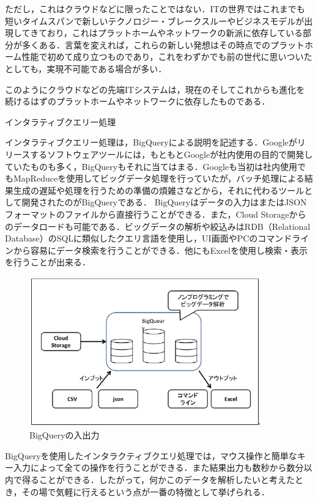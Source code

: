 ただし，これはクラウドなどに限ったことではない．ITの世界ではこれまでも短いタイムスパンで新しいテクノロジー・ブレークスルーやビジネスモデルが出現してきており，これはプラットホームやネットワークの新派に依存している部分が多くある．言葉を変えれば，これらの新しい発想はその時点でのプラットホーム性能で初めて成り立つものであり，これをわずかでも前の世代に思いついたとしても，実現不可能である場合が多い．

このようにクラウドなどの先端ITシステムは，現在のそしてこれからも進化を続けるはずのプラットホームやネットワークに依存したものである．


インタラティブクエリー処理

インタラティブクエリー処理は，BigQueryによる説明を記述する．Googleがリリースするソフトウェアツールには，もともとGoogleが社内使用の目的で開発していたものも多く，BigQueryもそれに当てはまる．Googleも当初は社内使用でもMapReduceを使用してビッグデータ処理を行っていたが，バッチ処理による結果生成の遅延や処理を行うための準備の煩雑さなどから，それに代わるツールとして開発されたのがBigQueryである．
BigQueryはデータの入力はまたはJSONフォーマットのファイルから直接行うことができる．また，Cloud Storageからのデータロードも可能である．ビッグデータの解析や絞込みはRDB（Relational Database）のSQLに類似したクエリ言語を使用し，UI画面やPCのコマンドラインから容易にデータ検索を行うことができる．他にもExcelを使用し検索・表示を行うことが出来る．


\begin{figure}[H]
\centering
\includegraphics[width=10cm]{bigqueryinout.png}
\caption{BigQueryの入出力}\label{サンプル図}
\end{figure}


BigQueryを使用したインタラクティブクエリ処理では，マウス操作と簡単なキー入力によって全ての操作を行うことができる．また結果出力も数秒から数分以内で得ることができる．したがって，何かこのデータを解析したいと考えたとき，その場で気軽に行えるという点が一番の特徴として挙げられる．


